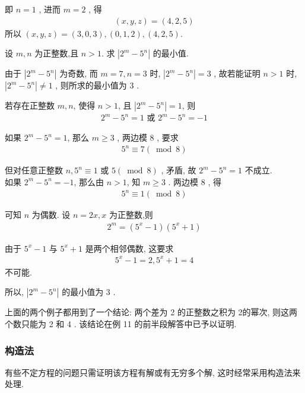 \begin{solution}
	即 $n=1$ , 进而 $m=2$ , 得
	\begin{align*}
		(x, y, z)=(4,2,5)
	\end{align*}
	所以 $(x, y, z)=(3,0,3),(0,1,2),(4,2,5)$.
\end{solution}

\begin{example}
	设 $m ,  n$ 为正整数,且 $n>1$. 求 $\left|2^{m}-5^{n}\right|$ 的最小值.
\end{example}
\begin{solution}
	由于 $\left|2^{m}-5^{n}\right|$ 为奇数, 而 $m=7, n=3$ 时,  $\left|2^{m}-5^{n}\right|=3$ , 故若能证明 $n>1$ 时,  $\left|2^{m}-5^{n}\right| \neq 1$ , 则所求的最小值为 3 .

	若存在正整数 $m ,  n$, 使得 $n>1$, 且 $\left|2^{m}-5^{n}\right|=1$, 则
	\begin{align*}
		2^{m}-5^{n}=1 \text { 或 } 2^{m}-5^{n}=-1
	\end{align*}

	如果 $2^{m}-5^{n}=1$, 那么 $m \geqslant 3$ , 两边模 8 , 要求
	\begin{align*}
		5^{n} \equiv 7(\bmod 8)
	\end{align*}

	但对任意正整数 $n, 5^{n} \equiv 1$ 或 $5(\bmod 8)$ , 矛盾, 故 $2^{m}-5^{n}=1$ 不成立. \\
	如果 $2^{m}-5^{n}=-1$, 那么由 $n>1$, 知 $m \geqslant 3$ . 两边模 8 , 得
	\begin{align*}
		5^{n} \equiv 1(\bmod 8)
	\end{align*}

	可知 $n$ 为偶数. 设 $n=2 x, x$ 为正整数,则
	\begin{align*}
		2^{m}=\left(5^{x}-1\right)\left(5^{x}+1\right)
	\end{align*}

	由于 $5^{x}-1$ 与 $5^{x}+1$ 是两个相邻偶数, 这要求
	\begin{align*}
		5^{x}-1=2,5^{x}+1=4
	\end{align*}
	不可能.

	所以,  $\left|2^{m}-5^{n}\right|$ 的最小值为 3 .
\end{solution}
\begin{note}
	上面的两个例子都用到了一个结论: 两个差为 2 的正整数之积为 2的幂次, 则这两个数只能为 2 和 4 . 该结论在例 11 的前半段解答中已予以证明.
\end{note}

\subsubsection{构造法}
有些不定方程的问题只需证明该方程有解或有无穷多个解, 这时经常采用构造法来处理.

